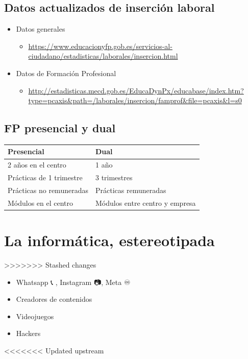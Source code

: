 \documentclass{article}
\begin{document}
\subsection*{Datos actualizados de inserción laboral}
\label{sec:org000000c}
\begin{itemize}
\item Datos generales
\begin{itemize}
\item \url{https://www.educacionyfp.gob.es/servicios-al-ciudadano/estadisticas/laborales/insercion.html}
\end{itemize}
\item Datos de Formación Profesional
\begin{itemize}
\item \url{http://estadisticas.mecd.gob.es/EducaDynPx/educabase/index.htm?type=pcaxis\&path=/laborales/insercion/famprof\&file=pcaxis\&l=s0}
\end{itemize}
\end{itemize}

\subsection*{FP presencial y dual}
\label{sec:org000000f}
\begin{center}
\begin{tabular}{ll}
Presencial & Dual\\
\hline
2 años en el centro & 1 año\\
Prácticas de 1 trimestre & 3 trimestres\\
Prácticas no remuneradas & Prácticas remuneradas\\
Módulos en el centro & Módulos entre centro  y empresa\\
\end{tabular}
\end{center}

\section*{La informática, estereotipada}
\label{sec:org0000018}
>>>>>>> Stashed changes
\begin{itemize}
\item Whatsapp 📞 , Instagram 📷, Meta ♾️
\item Creadores de contenidos
\item Videojuegos
\item Hackers
\end{itemize}
<<<<<<< Updated upstream
\end{document}
